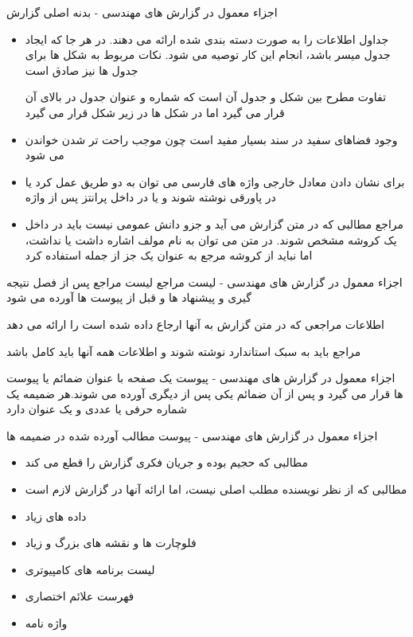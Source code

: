 \documentclass[14pt]{beamer}
\makeatletter
\newcommand{\rtlist}{\raggedleft\rightskip\@totalleftmargin}
\newcommand{\framefontsizelarge}{\fontsize{18pt}{0pt}\selectfont}
\newcommand{\frametitlefontsize}{\fontsize{20pt}{0pt}\selectfont}
\makeatother
\begin{document}
\begin{persian}
\begin{frame}[allowframebreaks]{\frametitlefontsize  اجزاء معمول در گزارش های مهندسی - بدنه اصلی گزارش}
\begin{itemize}
			اگر ابعاد شکل طوری باشد که لازم شود در طول صفحه قرار داده شود، برای صفحات سمت راست گزارش، بالای شکل و برای صفحات سمت چپ، پایین شکل به سمت شیرازه قرار می گیرند
			\item جداول اطلاعات را به صورت دسته بندی شده ارائه می دهند. در هر جا که ایجاد جدول میسر باشد، انجام این کار توصیه می شود. نکات مربوط به شکل ها برای جدول ها نیز صادق است
			
			تفاوت مطرح بین شکل و جدول آن است که شماره و عنوان جدول در بالای آن قرار می گیرد اما در شکل ها در زیر شکل قرار می گیرد
			\item وجود فضاهای سفید در سند بسیار مفید است چون موجب راحت تر شدن خواندن می شود
			\item برای نشان دادن معادل خارجی واژه های فارسی می توان به دو طریق عمل کرد یا در پاورقی نوشته شوند و یا در داخل پرانتز پس از واژه
			\item مراجع مطالبی که در متن گزارش می آید و جزو دانش عمومی نیست باید در داخل یک کروشه مشخص شوند. در متن می توان به نام مولف اشاره داشت یا نداشت، اما نباید از کروشه مرجع به عنوان یک جز از جمله استفاده کرد
		\end{itemize}
	\end{frame}		

	\begin{frame}[plain]{\frametitlefontsize  اجزاء معمول در گزارش های مهندسی - لیست مراجع}
		\framefontsizelarge
		لیست مراجع پس از فصل نتیجه گیری و پیشنهاد ها و قبل از پیوست ها آورده می شود
		
		اطلاعات مراجعی که در متن گزارش به آنها ارجاع داده شده است را ارائه می دهد
		
		مراجع باید به سبک استاندارد نوشته شوند و اطلاعات همه آنها باید کامل باشد
	\end{frame}	
	
	\begin{frame}[plain]{\frametitlefontsize  اجزاء معمول در گزارش های مهندسی - پیوست}
		\framefontsizelarge
		یک صفحه با عنوان ضمائم یا پیوست ها قرار می گیرد و پس از آن ضمائم یکی پس از دیگری آورده می شوند.هر ضمیمه یک شماره حرفی یا عددی و یک عنوان دارد
	\end{frame}	
	
	\begin{frame}[plain]{\frametitlefontsize  اجزاء معمول در گزارش های مهندسی - پیوست}
		\framefontsizelarge
		مطالب آورده شده در ضمیمه ها 
		
		\begin{itemize}\rtlist
			\item مطالبی که حجیم بوده و جریان فکری گزارش را قطع می کند
			\item مطالبی که از نظر نویسنده مطلب اصلی نیست، اما ارائه آنها در گزارش لازم است
			\item داده های زیاد
			\item فلوچارت ها و نقشه های بزرگ و زیاد
			\item لیست برنامه های کامپیوتری
			\item فهرست علائم اختصاری
			\item واژه نامه
		\end{itemize}
	\end{frame}	
	

\end{persian}
\end{document}

